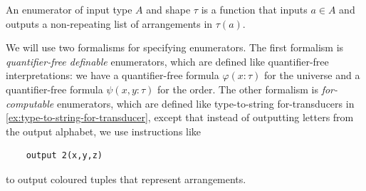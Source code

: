 \begin{definition}[Enumerator]\label{def:tuple-enumerator} 
    An enumerator of input type $A$ and shape $\tau$  is a function that inputs $a \in A$ and outputs a non-repeating list of arrangements in $\tau(a)$. 
\end{definition}

We will use two formalisms for specifying enumerators. The first formalism is  \emph{quantifier-free definable} enumerators, which are defined  like quantifier-free interpretations: we have a quantifier-free formula $\varphi(x : \tau)$ for the universe and a quantifier-free formula $\psi(x, y : \tau)$ for the order.  The other formalism is  \emph{for-computable} enumerators,  which are defined like  type-to-string for-transducers  in \cref{ex:type-to-string-for-transducer}, except that instead of outputting letters from the output alphabet, we use instructions like 
\begin{lstlisting}
    output 2(x,y,z)
\end{lstlisting}
to output coloured tuples that represent arrangements.  


